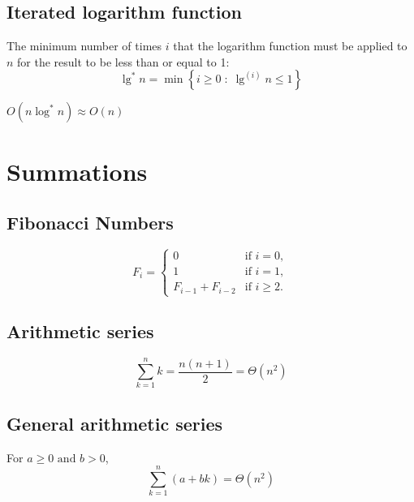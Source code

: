 \documentclass{article}
\begin{document}
\subsection{Iterated logarithm function}
\begin{definition}
    The minimum number of times \( i \) that the logarithm function must be applied to \( n \) for the result to be less than or equal to 1:
    \begin{equation}
        \lg^{*} n = \min \left\{ i \geq 0 \; : \; \lg^{(i)} n \leq 1 \right\}
    \end{equation}
\end{definition}

\begin{warning}
    $O(n\log^* n) \approx O(n)$
\end{warning}

\newpage

\section{Summations}
    \subsection{Fibonacci Numbers}
        \begin{definition}
            \begin{equation}
                F_i = 
                \begin{cases}
                    0 & \text{if } i = 0, \\
                    1 & \text{if } i = 1, \\
                    F_{i-1} + F_{i-2} & \text{if } i \geq 2.
                \end{cases}
            \end{equation}
        \end{definition}

    \subsection{Arithmetic series}
        \begin{definition}
            \begin{equation}
                \sum_{k=1}^{n} k = \frac{n(n+1)}{2} = \Theta(n^2)
            \end{equation}
        \end{definition}

    \subsection{General arithmetic series}
        \begin{definition}
            For $a \geq 0 \text{ and } b > 0$,
            \begin{equation}
                \sum_{k=1}^{n} (a + bk) = \Theta(n^2)    
            \end{equation}
        \end{definition}
\end{document}

